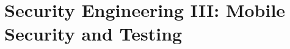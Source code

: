 \documentclass[../main.tex]{subfiles}
\begin{document}
\chapter{Security Engineering III: Mobile Security and Testing}
\label{ch:mobile-security-testing}

\end{document}
